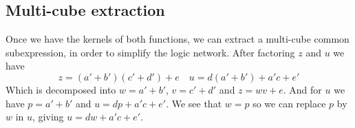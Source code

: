 \documentclass[a4paper]{article}
\begin{document}
\subsection{Multi-cube extraction}
%
Once we have the kernels of both functions, we can extract a multi-cube common 
subexpression, in order to simplify the logic network. After factoring $z$ and 
$u$ we have
%
$$ z = (a' + b')(c' + d') + e \quad  u = d(a' + b') + a'c + e'$$
%
Which is decomposed into $ w = a'+b'$, $v = c'+d'$ and $ z = wv+e $. And for $u$ 
we have $p = a'+b'$ and $u = dp + a'c + e'$. We see that $w = p$ so we can 
replace $p$ by $w$ in $u$, giving $u = dw + a'c + e'$.
%



\newpage



\end{document}
